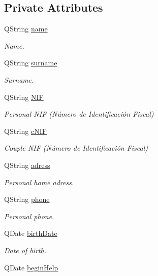 \subsection*{Private Attributes}
\begin{DoxyCompactItemize}
\item 
Q\+String \hyperlink{classinfo_a27cfacf228447e06d83abd01882eb78d}{name}
\begin{DoxyCompactList}\small\item\em Name. \end{DoxyCompactList}\item 
Q\+String \hyperlink{classinfo_a9dd9f00d6b74f1d7b4519e509efd0031}{surname}
\begin{DoxyCompactList}\small\item\em Surname. \end{DoxyCompactList}\item 
Q\+String \hyperlink{classinfo_a68e2c3e3e7e8e6df17e1f5b466506319}{N\+I\+F}
\begin{DoxyCompactList}\small\item\em Personal N\+I\+F (Número de Identificación Fiscal) \end{DoxyCompactList}\item 
Q\+String \hyperlink{classinfo_a46ee4d6a7e5976d795ed9efa02341fce}{c\+N\+I\+F}
\begin{DoxyCompactList}\small\item\em Couple N\+I\+F (Número de Identificación Fiscal) \end{DoxyCompactList}\item 
Q\+String \hyperlink{classinfo_a589dff7ad548e9ac9a45f632539c9a0a}{adress}
\begin{DoxyCompactList}\small\item\em Personal home adress. \end{DoxyCompactList}\item 
Q\+String \hyperlink{classinfo_a716fe5520eb096be308dcd18f7cbd1c1}{phone}
\begin{DoxyCompactList}\small\item\em Personal phone. \end{DoxyCompactList}\item 
Q\+Date \hyperlink{classinfo_a2269c62bc80419abee5ab99596715014}{birth\+Date}
\begin{DoxyCompactList}\small\item\em Date of birth. \end{DoxyCompactList}\item 
Q\+Date \hyperlink{classinfo_a860bf129937fda542024222bd425a224}{begin\+Help}

\end{DoxyCompactItemize}
